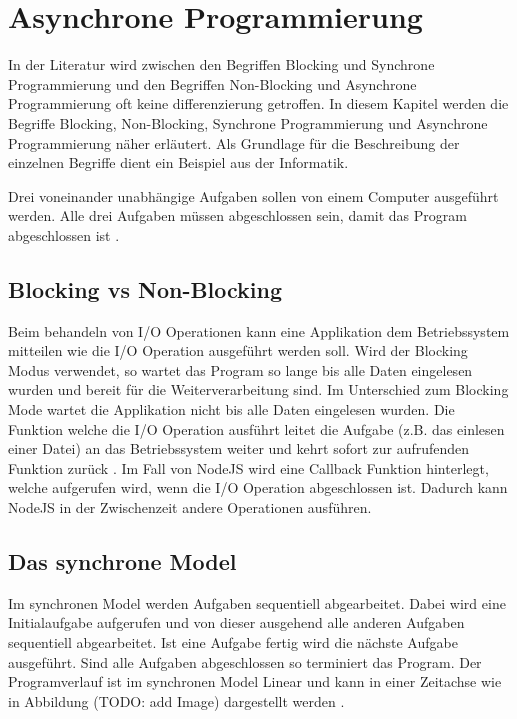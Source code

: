 \section{Asynchrone Programmierung}

In der Literatur wird zwischen den Begriffen Blocking und Synchrone Programmierung und den Begriffen Non-Blocking und Asynchrone Programmierung oft keine differenzierung getroffen. In diesem Kapitel werden die Begriffe Blocking, Non-Blocking, Synchrone Programmierung und Asynchrone Programmierung näher erläutert. Als Grundlage für die Beschreibung der einzelnen Begriffe dient ein Beispiel aus der Informatik. 

Drei voneinander unabhängige Aufgaben sollen von einem Computer ausgeführt werden. Alle drei Aufgaben müssen abgeschlossen sein, damit das Program abgeschlossen ist \cite[]{Pet2015}. 

\subsection{Blocking vs Non-Blocking}

Beim behandeln von I/O Operationen kann eine Applikation dem Betriebssystem mitteilen wie die I/O Operation ausgeführt werden soll. Wird der Blocking Modus verwendet, so wartet das Program so lange bis alle Daten eingelesen wurden und bereit für die Weiterverarbeitung sind. Im Unterschied zum Blocking Mode wartet die Applikation nicht bis alle Daten eingelesen wurden. Die Funktion welche die I/O Operation ausführt leitet die Aufgabe (z.B. das einlesen einer Datei) an das Betriebssystem weiter und kehrt sofort zur aufrufenden Funktion zurück \cite[p. 47]{Erb2012}. Im Fall von NodeJS wird eine Callback Funktion hinterlegt, welche aufgerufen wird, wenn die I/O Operation abgeschlossen ist. Dadurch kann NodeJS in der Zwischenzeit andere Operationen ausführen. 

\subsection{Das synchrone Model}

Im synchronen Model werden Aufgaben sequentiell abgearbeitet. Dabei wird eine Initialaufgabe aufgerufen und von dieser ausgehend alle anderen Aufgaben sequentiell abgearbeitet. Ist eine Aufgabe fertig wird die nächste Aufgabe ausgeführt. Sind alle Aufgaben abgeschlossen so terminiert das Program. Der Programverlauf ist im synchronen Model Linear und kann in einer Zeitachse wie in Abbildung (TODO: add Image) dargestellt werden \cite[]{Pet2015}.


